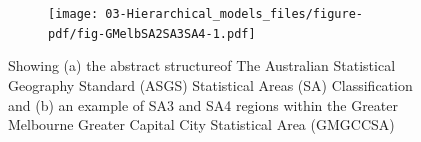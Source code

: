 \documentclass[
  letterpaper,
  DIV=11,
  numbers=noendperiod]{scrreprt}
\begin{document}
\begin{figure}

\begin{minipage}[t]{0.50\linewidth}

{\centering 


}

\subcaption{\label{fig-ASGS}}
\end{minipage}%
%
\begin{minipage}[t]{0.50\linewidth}

{\centering 

\begin{figure}

{\centering \texttt{[image: 03-Hierarchical\_models\_files/figure-pdf/fig-GMelbSA2SA3SA4-1.pdf]}

}

\end{figure}

}

\end{minipage}%

\caption{\label{fig-ASGSSA}Showing (a) the abstract structureof The
Australian Statistical Geography Standard (ASGS) Statistical Areas (SA)
Classification and (b) an example of SA3 and SA4 regions within the
Greater Melbourne Greater Capital City Statistical Area (GMGCCSA)}

\end{figure}
\end{document}
